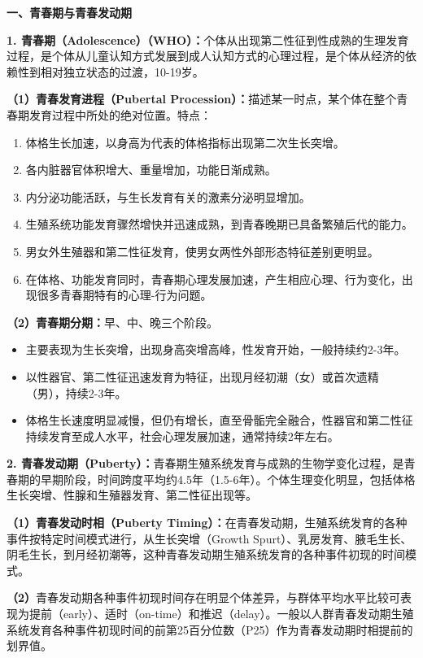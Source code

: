 \begin{keybox}
\textbf{一、青春期与青春发动期}

\textbf{1. 青春期（Adolescence）（WHO）：}个体从出现第二性征到性成熟的生理发育过程，是个体从儿童认知方式发展到成人认知方式的心理过程，是个体从经济的依赖性到相对独立状态的过渡，10-19岁。

\textbf{（1）青春发育进程（Pubertal Procession）：}描述某一时点，某个体在整个青春期发育过程中所处的绝对位置。特点：
\begin{enumerate}[leftmargin=*]
    \item 体格生长加速，以身高为代表的体格指标出现第二次生长突增。
    \item 各内脏器官体积增大、重量增加，功能日渐成熟。
    \item 内分泌功能活跃，与生长发育有关的激素分泌明显增加。
    \item 生殖系统功能发育骤然增快并迅速成熟，到青春晚期已具备繁殖后代的能力。
    \item 男女外生殖器和第二性征发育，使男女两性外部形态特征差别更明显。
    \item 在体格、功能发育同时，青春期心理发展加速，产生相应心理、行为变化，出现很多青春期特有的心理-行为问题。
\end{enumerate}

\textbf{（2）青春期分期：}早、中、晚三个阶段。
\begin{itemize}[leftmargin=*]
    \item {}主要表现为生长突增，出现身高突增高峰，性发育开始，一般持续约2-3年。
    \item {}以性器官、第二性征迅速发育为特征，出现月经初潮（女）或首次遗精（男），持续2-3年。
    \item {}体格生长速度明显减慢，但仍有增长，直至骨骺完全融合，性器官和第二性征持续发育至成人水平，社会心理发展加速，通常持续2年左右。
\end{itemize}

\vspace{3pt}
\begin{center}
\end{center}
\vspace{3pt}

\textbf{2. 青春发动期（Puberty）：}青春期生殖系统发育与成熟的生物学变化过程，是青春期的早期阶段，时间跨度平均约4.5年（1.5-6年）。个体生理变化明显，包括体格生长突增、性腺和生殖器发育、第二性征出现等。

\textbf{（1）青春发动时相（Puberty Timing）：}在青春发动期，生殖系统发育的各种事件按特定时间模式进行，从生长突增（Growth Spurt）、乳房发育、腋毛生长、阴毛生长，到月经初潮等，这种青春发动期生殖系统发育的各种事件初现的时间模式。

\textbf{（2）}青春发动期各种事件初现时间存在明显个体差异，与群体平均水平比较可表现为提前（early）、适时（on-time）和推迟（delay）。一般以人群青春发动期生殖系统发育各种事件初现时间的前第25百分位数（P25）作为青春发动期时相提前的划界值。
\end{keybox}

